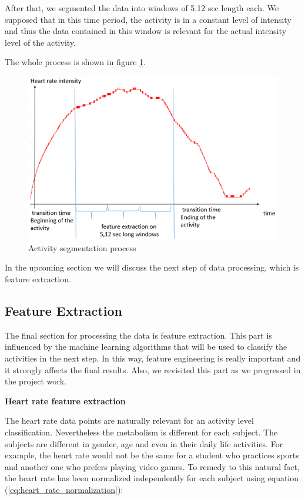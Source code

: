 \documentclass[12pt, a4paper, onecolumn, oneside, parskip=half]{scrartcl}
\begin{document}
After that, we segmented the data into windows of 5.12 sec length each. We supposed that in this time period, the activity is in a constant level of intensity and thus the data contained in this window is relevant for the actual intensity level of the activity.

The whole process is shown in figure \ref{Activity segmentation process}.

\begin{figure}[H]
  \centering
  \includegraphics[width=160mm]{pictures/Data_segmentation.png}
  \caption{Activity segmentation process \label{Activity segmentation process}}
\end{figure}



In the upcoming section we will discuss the next step of data processing, which is feature extraction.

\subsection{Feature Extraction}

The final section for processing the data is feature extraction. This part is influenced by the machine learning algorithms that will be used to classify the activities in the next step. In this way, feature engineering is really important and it strongly affects the final results. Also, we revisited this part as we progressed in the project work.

\textbf{Heart rate feature extraction}

The heart rate data points are naturally relevant for an activity level classification. Nevertheless the metabolism is different for each subject. The subjects are different in gender, age and even in their daily life activities. For example, the heart rate would not be the same for a student who practices sports and another one who prefers playing video games. To remedy to this natural fact, the heart rate has been normalized independently for each subject using equation (\ref{eq:heart_rate_normalization}):
 
\end{document}
